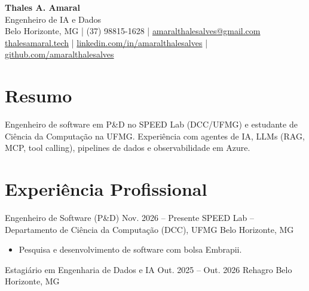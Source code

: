 \documentclass[10pt,a4paper]{article}
\begin{document}

\begin{center}
    {\Large\bfseries Thales A. Amaral}\\[2pt]
    Engenheiro de IA e Dados\\[3pt]

    Belo Horizonte, MG
    \quad | \quad
    (37) 98815-1628
    \quad | \quad
    \href{mailto:amaralthalesalves@gmail.com}{amaralthalesalves@gmail.com}\\[2pt]

    \href{https://thalesamaral.tech}{thalesamaral.tech}
    \quad | \quad
    \href{https://www.linkedin.com/in/amaralthalesalves/}{linkedin.com/in/amaralthalesalves}
    \quad | \quad
    \href{https://github.com/amaralthalesalves}{github.com/amaralthalesalves}
\end{center}

\section*{Resumo}

Engenheiro de software em P\&D no SPEED Lab (DCC/UFMG) e estudante de Ciência da Computação na UFMG.
Experiência com agentes de IA, LLMs (RAG, MCP, tool calling), pipelines de dados e observabilidade em Azure.

\section*{Experiência Profissional}

\entry
{Engenheiro de Software (P\&D)}
{Nov. 2026 -- Presente}
{SPEED Lab -- Departamento de Ciência da Computação (DCC), UFMG}
{Belo Horizonte, MG}

\begin{itemize}
    \item Pesquisa e desenvolvimento de software com bolsa Embrapii.
\end{itemize}

\entry
{Estagiário em Engenharia de Dados e IA}
{Out. 2025 -- Out. 2026}
{Rehagro}
{Belo Horizonte, MG}
\end{document}
